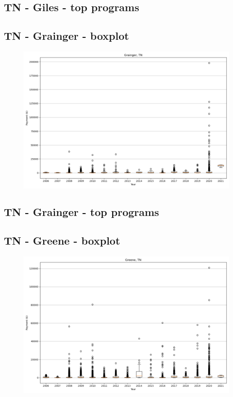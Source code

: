 \subsection*{TN - Giles - top programs}

\newpage
\subsection*{TN - Grainger - boxplot}
\begin{figure}[h]
\centering
\includegraphics[width=7in]{../output/boxplots/counties/Grainger-TN_boxplot.png}
\end{figure}


\subsection*{TN - Grainger - top programs}

\newpage
\subsection*{TN - Greene - boxplot}
\begin{figure}[h]
\centering
\includegraphics[width=7in]{../output/boxplots/counties/Greene-TN_boxplot.png}
\end{figure}


